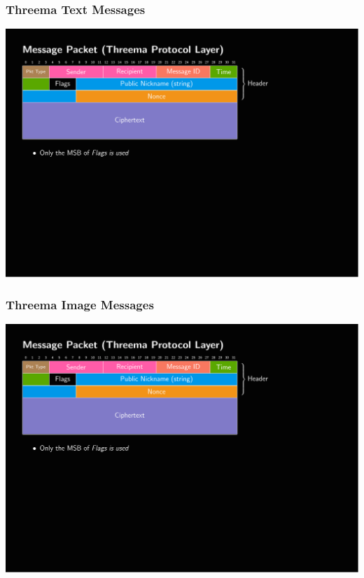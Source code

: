 \documentclass[
	aspectratio=169,
	xetex,
]{beamer}
\begin{document}
\begin{frame}
	\frametitle{Threema Text Messages}
	\includegraphics[page=3,clip,trim={.99cm 7.5cm 3.2cm 1.8cm},width=\textwidth]{out/messages.pdf}
\end{frame}

\begin{frame}
	\frametitle{Threema Image Messages}
	\includegraphics[page=4,clip,trim={.99cm 7.5cm 3.2cm 1.8cm},width=\textwidth]{out/messages.pdf}
\end{frame}
\end{document}
